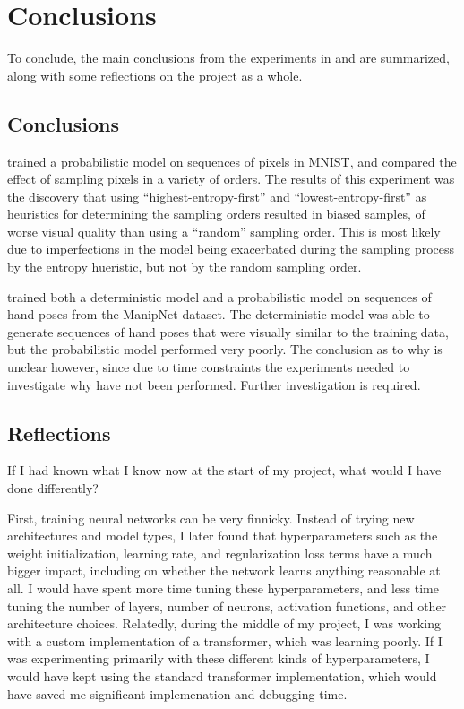 \chapter{Conclusions}
\label{C:conclusion}

To conclude, the main conclusions from the experiments in  and  are summarized, along with some reflections on the project as a whole.

\section{Conclusions}

 trained a probabilistic model on sequences of pixels in MNIST, and compared the effect of sampling pixels in a variety of orders. The results of this experiment was the discovery that using ``highest-entropy-first'' and ``lowest-entropy-first'' as heuristics for determining the sampling orders resulted in biased samples, of worse visual quality than using a ``random'' sampling order. This is most likely due to imperfections in the model being exacerbated during the sampling process by the entropy hueristic, but not by the random sampling order.

 trained both a deterministic model and a probabilistic model on sequences of hand poses from the ManipNet dataset. The deterministic model was able to generate sequences of hand poses that were visually similar to the training data, but the probabilistic model performed very poorly. The conclusion as to why is unclear however, since due to time constraints the experiments needed to investigate why have not been performed. Further investigation is required.

\section{Reflections}

If I had known what I know now at the start of my project, what would I have done differently?

First, training neural networks can be very finnicky. Instead of trying new architectures and model types, I later found that hyperparameters such as the weight initialization, learning rate, and regularization loss terms have a much bigger impact, including on whether the network learns anything reasonable at all. I would have spent more time tuning these hyperparameters, and less time tuning the number of layers, number of neurons, activation functions, and other architecture choices. Relatedly, during the middle of my project, I was working with a custom implementation of a transformer, which was learning poorly. If I was experimenting primarily with these different kinds of hyperparameters, I would have kept using the standard transformer implementation, which would have saved me significant implemenation and debugging time.

